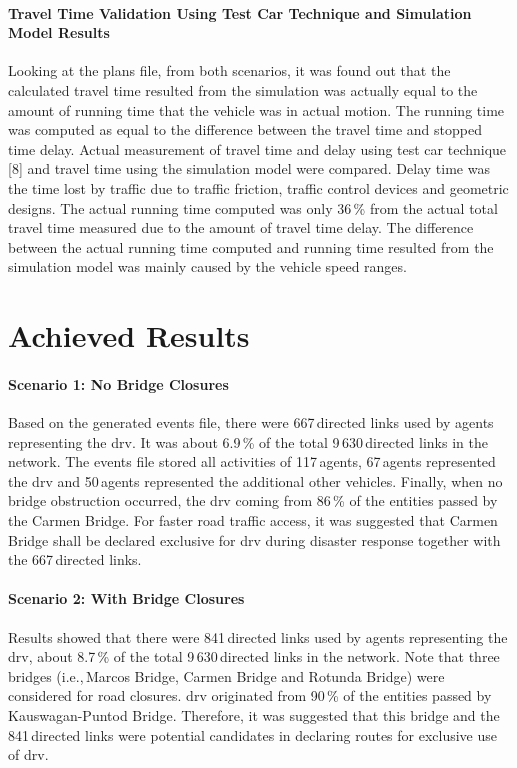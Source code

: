 \paragraph{Travel Time Validation Using Test Car Technique and Simulation Model Results}
Looking at the plans file, from both scenarios, it was found out that the calculated travel time resulted from the simulation was actually equal to the amount of running time that the vehicle was in actual motion. The running time was computed as equal to the difference between the travel time and stopped time delay. Actual measurement of travel time and delay using test car technique [8] and travel time using the simulation model were compared. Delay time was the time lost by traffic due to traffic friction, traffic control devices and geometric designs. The actual running time computed was only 36\,\% from the actual total travel time measured due to the amount of travel time delay. The difference between the actual running time computed and running time resulted from the simulation model was mainly caused by the vehicle speed ranges. 

\section{Achieved Results}
\paragraph{Scenario 1: No Bridge Closures}
Based on the generated events file, there were 667\,directed links used by agents representing the \gls{drv}. It was about 6.9\,\% of the total 9\,630\,directed links in the network. The events file stored all activities of 117\,agents, 67\,agents represented the \gls{drv} and 50\,agents represented the additional other vehicles. Finally, when no bridge obstruction occurred, the \gls{drv} coming from 86\,\% of the entities passed by the Carmen Bridge. For faster road traffic access, it was suggested that Carmen Bridge shall be declared exclusive for \gls{drv} during disaster response together with the 667\,directed links.

\paragraph{Scenario 2: With Bridge Closures}
Results showed that there were 841\,directed links used by agents representing the \gls{drv}, about 8.7\,\% of the total 9\,630\,directed links in the network. Note that three bridges (i.e.,\,Marcos Bridge, Carmen Bridge and Rotunda Bridge) were considered for road closures. \gls{drv} originated from 90\,\% of the entities passed by Kauswagan-Puntod Bridge. Therefore, it was suggested that this bridge and the 841\,directed links were potential candidates in declaring routes for exclusive use of \gls{drv}.

